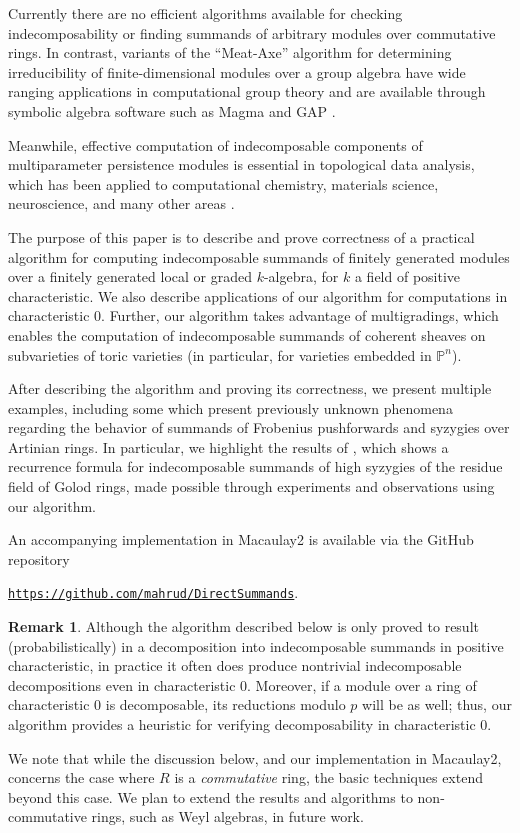 \documentclass[12pt]{article}
\def\PP{\mathbb P}
\theoremstyle{theorem}
\numberwithin{thm}{section}
\theoremstyle{definition}
\newtheorem{rem}[thm]{Remark}
\begin{document}
Currently there are no efficient algorithms available for checking indecomposability or finding summands of arbitrary modules over commutative rings. In contrast, variants of the ``Meat-Axe'' algorithm for determining irreducibility of finite-dimensional modules over a group algebra have wide ranging applications in computational group theory \cite{Parker84,HR94,Holt98} and are available through symbolic algebra software such as Magma and GAP \cite{MAGMA,GAP}.

Meanwhile, effective computation of indecomposable components of multiparameter persistence modules is essential in topological data analysis, which has been applied to computational chemistry, materials science, neuroscience, and many other areas \cite{BL23}.

The purpose of this paper is to describe and prove correctness of a practical algorithm for computing indecomposable summands of finitely generated modules over a finitely generated local or graded $k$-algebra, for $k$ a field of positive characteristic. We also describe applications of our algorithm for computations in characteristic 0. Further, our algorithm takes advantage of multigradings, which enables the computation of indecomposable summands of coherent sheaves on subvarieties of toric varieties (in particular, for varieties embedded in $\PP^n$).

After describing the algorithm and proving its correctness, we present multiple examples, including some which present previously unknown phenomena regarding the behavior of summands of Frobenius pushforwards and syzygies over Artinian rings. In particular, we highlight the results of \cite{CDE24}, which shows a recurrence formula for indecomposable summands of high syzygies of the residue field of Golod rings, made possible through experiments and observations using our algorithm.

An accompanying implementation in Macaulay2 \cite{M2} is available via the GitHub repository \\
\centerline{
  \href{https://github.com/mahrud/DirectSummands}
  {\texttt{https://github.com/mahrud/DirectSummands}}.}


\begin{rem}
Although the algorithm described below is only proved to result (probabilistically) in a decomposition into indecomposable summands in positive characteristic, in practice it often does produce nontrivial indecomposable decompositions even in characteristic 0. Moreover, if a module over a ring of characteristic 0 is decomposable, its reductions modulo $p$ will be as well; thus, our algorithm provides a heuristic for verifying decomposability in characteristic 0.

  We note that while the discussion below, and our implementation in Macaulay2, concerns the case where $R$ is a \emph{commutative} ring, the basic techniques extend beyond this case. We plan to extend the results and algorithms to non-commutative rings, such as Weyl algebras, in future work.
\end{rem}
\end{document}
